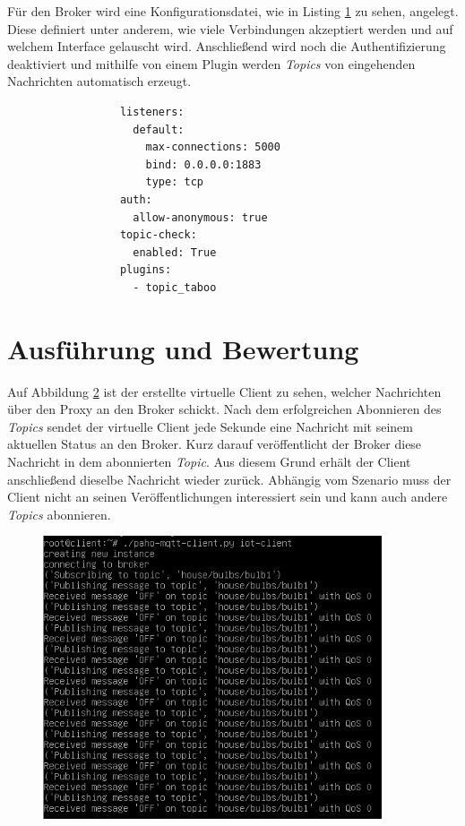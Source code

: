     Für den Broker wird eine Konfigurationsdatei, wie in Listing \ref{fig:broker_config} zu sehen, angelegt. Diese definiert unter anderem, wie viele Verbindungen akzeptiert werden und auf welchem Interface gelauscht wird. Anschließend wird noch die Authentifizierung deaktiviert und mithilfe von einem Plugin werden \emph{Topics} von eingehenden Nachrichten automatisch erzeugt. 
    \begin{figure}[h]
        \begin{lstlisting}
            listeners:
              default:
                max-connections: 5000
                bind: 0.0.0.0:1883
                type: tcp
            auth:
              allow-anonymous: true
            topic-check:
              enabled: True
            plugins:
              - topic_taboo
        \end{lstlisting}
        \label{fig:broker_config}
    \end{figure}

\section{Ausführung und Bewertung}
    Auf Abbildung \ref{fig:client_messages} ist der erstellte virtuelle Client zu sehen, welcher Nachrichten über den Proxy an den Broker schickt.
    Nach dem erfolgreichen Abonnieren des \emph{Topics} sendet der virtuelle Client jede Sekunde eine Nachricht mit seinem aktuellen Status an den Broker. Kurz darauf veröffentlicht der Broker diese Nachricht in dem abonnierten \emph{Topic}. Aus diesem Grund erhält der Client anschließend dieselbe Nachricht wieder zurück. Abhängig vom Szenario muss der Client nicht an seinen Veröffentlichungen interessiert sein und kann auch andere \emph{Topics} abonnieren.
    \begin{figure}[!h]%
        \centering
        \includegraphics[width=10cm]{tex/bilder/6_validierung/ClientMessages.png}
        \label{fig:client_messages}
    \end{figure}
    
